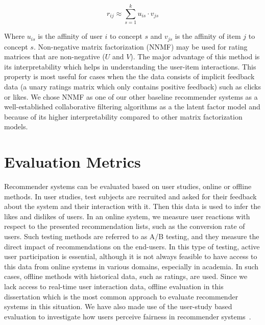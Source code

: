            \begin{equation}
               r_{ij} \approx \sum_{s=1}^{k} u_{is} \cdot v_{js}
           \end{equation}
           \vspace{0.25cm}
       
            Where $u_{is}$ is the affinity of user $i$ to concept $s$ and $v_{js}$ is the affinity of item $j$ to concept $s$. Non-negative matrix factorization (NNMF) \cite{lee2001algorithms,zhang2006learning} may be used for rating matrices that are non-negative ($U$ and $V$). The major advantage of this method is its interpretability which helps in understanding the user-item interactions. This property is most useful for cases when the the data consists of implicit feedback data (a unary ratings matrix which only contains positive feedback) such as clicks or likes. We chose NNMF as one of our other baseline recommender systems as a well-established collaborative filtering algorithms as a the latent factor model and because of its higher interpretability compared to other matrix factorization models.
       

\section{Evaluation Metrics}
\label{sec:eval}
    
    Recommender systems can be evaluated based on user studies, online or offline methods. In user studies, test subjects are recruited and asked for their feedback about the system and their interaction with it. Then this data is used to infer the likes and dislikes of users. In an online system, we measure user reactions with respect to the presented recommendation lists, such as the conversion rate of users. Such testing methods are referred to as A/B testing, and they measure the direct impact of recommendations on the end-users. In this type of testing, active user participation is essential, although it is not always feasible to have access to this data from online systems in various domains, especially in academia. In such cases, offline methods with historical data, such as ratings, are used. Since we lack access to real-time user interaction data, offline evaluation in this dissertation which is the most common approach to evaluate recommender systems in this situation. We have also made use of the user-study based evaluation to investigate how users perceive fairness in recommender systems~\cite{Sonboli2021transparency}.
    
